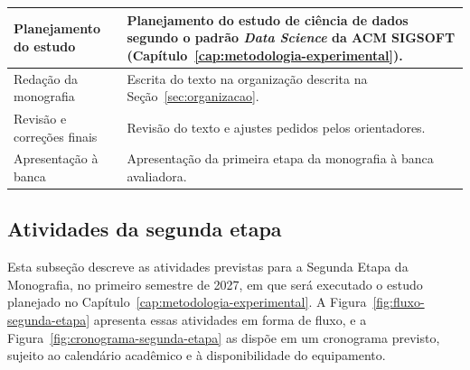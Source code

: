 \begin{longtable}{|>{\raggedright\arraybackslash}p{4.2cm}|>{\raggedright\arraybackslash}p{10.8cm}|}
	\hline
	Planejamento do estudo           & Planejamento do estudo de ciência de dados segundo
	o padrão \textit{Data Science} da ACM SIGSOFT \cite{acmSigsoftDataScience}
	(Capítulo~\ref{cap:metodologia-experimental}).                                                       \\
	\hline
	Redação da monografia            & Escrita do texto na organização descrita na
	Seção~\ref{sec:organizacao}.                                                                         \\
	\hline
	Revisão e correções finais       & Revisão do texto e ajustes pedidos pelos
	orientadores.                                                                                        \\
	\hline
	Apresentação à banca             & Apresentação da primeira etapa da monografia à banca
	avaliadora.                                                                                          \\
\end{longtable}
\endgroup
{}

\subsection{Atividades da segunda etapa}
\label{subsec:atividades-segunda-etapa}

Esta subseção descreve as atividades previstas para a Segunda Etapa da
Monografia, no primeiro semestre de 2027, em que será executado o estudo
planejado no Capítulo~\ref{cap:metodologia-experimental}. A
Figura~\ref{fig:fluxo-segunda-etapa} apresenta essas atividades em forma de
fluxo, e a Figura~\ref{fig:cronograma-segunda-etapa} as dispõe em um
cronograma previsto, sujeito ao calendário acadêmico e à disponibilidade do
equipamento.

